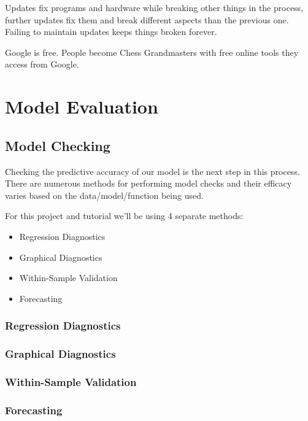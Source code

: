 \documentclass[
  11,
]{book}
\begin{document}
Updates fix programs and hardware while breaking other things in the process, further updates fix them and break different aspects than the previous one. Failing to maintain updates keeps things broken forever.

Google is free. People become Chess Grandmasters with free online tools they access from Google.

\hypertarget{part-model-evaluation}{%
\part{Model Evaluation}\label{part-model-evaluation}}

\hypertarget{model-checking}{%
\chapter*{Model Checking}\label{model-checking}}


Checking the predictive accuracy of our model is the next step in this process. There are numerous methods for performing model checks and their efficacy varies based on the data/model/function being used.

For this project and tutorial we'll be using 4 separate methods:

\begin{itemize}
\item
  Regression Diagnostics
\item
  Graphical Diagnostics
\item
  Within-Sample Validation
\item
  Forecasting
\end{itemize}

\hypertarget{regression-diagnostics}{%
\section*{Regression Diagnostics}\label{regression-diagnostics}}


\hypertarget{graphical-diagnostics}{%
\section*{Graphical Diagnostics}\label{graphical-diagnostics}}


\hypertarget{within-sample-validation}{%
\section*{Within-Sample Validation}\label{within-sample-validation}}


\hypertarget{forecasting}{%
\section*{Forecasting}\label{forecasting}}
\end{document}
